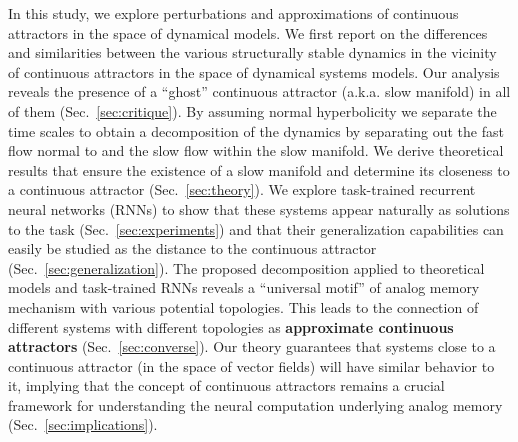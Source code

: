\documentclass{article} %
\newcommand{\pscomment}[1]{\textcolor{BurntOrange}{(#1)}}
\newcounter{ct}
\theoremstyle{definition}
\theoremstyle{remark}
\begin{document}
In this study, we explore perturbations and approximations of continuous attractors in the space of dynamical models.
We first report on the differences and similarities between the various structurally stable dynamics in the vicinity of continuous attractors in the space of dynamical systems models.
Our analysis reveals the presence of a ``ghost'' continuous attractor (a.k.a. slow manifold) in all of them (Sec.~\ref{sec:critique}).
By assuming normal hyperbolicity we separate the time scales to obtain a decomposition of the dynamics by separating out the fast flow normal to and the slow flow within the slow manifold.
We derive theoretical results that ensure the existence of a slow manifold and determine its closeness to a continuous attractor (Sec.~\ref{sec:theory}).
We explore task-trained recurrent neural networks (RNNs) to show that these systems appear naturally as solutions to the task (Sec.~\ref{sec:experiments}) and that their generalization capabilities can easily be studied as the distance to the continuous attractor (Sec.~\ref{sec:generalization}).
The proposed decomposition applied to theoretical models and task-trained RNNs reveals a ``universal motif'' of analog memory mechanism with various potential topologies.
This leads to the connection of different systems with different topologies as \textbf{approximate continuous attractors} (Sec.~\ref{sec:converse}).
Our theory guarantees that systems close to a continuous attractor (in the space of vector fields) will have similar behavior to it, implying that the concept of continuous attractors remains a crucial framework for understanding the neural computation underlying analog memory (Sec.~\ref{sec:implications}).
\end{document}
